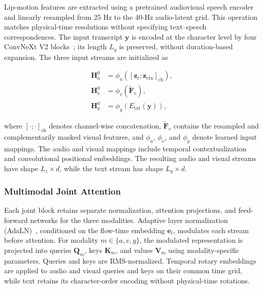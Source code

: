 Lip-motion features are extracted using a pretrained audiovisual speech encoder~\cite{shi2022avhubert} and linearly resampled from 25 Hz to the 40-Hz audio-latent grid. This operation matches physical-time resolutions without specifying text–speech correspondences. The input transcript \(\mathbf{y}\) is encoded at the character level by four ConvNeXt V2 blocks~\cite{woo2023convnext,chen2025f5tts}; its length \(L_y\) is preserved, without duration-based expansion. The three input streams are initialized as

\begin{equation}
\begin{aligned}
\mathbf{H}_a^0
&=
\phi_a\!\left(
[\mathbf{z}_t;\mathbf{z}_{\mathrm{ctx}}]_{\mathrm{ch}}
\right),\\
\mathbf{H}_v^0
&=
\phi_v(\widetilde{\mathbf{F}}_v),\\
\mathbf{H}_y^0
&=
\phi_y(E_{\mathrm{txt}}(\mathbf{y})),
\end{aligned}
\label{eq:audio_input}
\end{equation}

where \([\cdot;\cdot]_{\mathrm{ch}}\) denotes channel-wise concatenation, \(\widetilde{\mathbf{F}}_v\) contains the resampled and complementarily masked visual features, and \(\phi_a\), \(\phi_v\), and \(\phi_y\) denote learned input mappings. The audio and visual mappings include temporal contextualization and convolutional positional embeddings. The resulting audio and visual streams have shape \(L_z\times d\), while the text stream has shape \(L_y\times d\).

\subsubsection{Multimodal Joint Attention}

Each joint block retains separate normalization, attention projections, and feed-forward networks for the three modalities. Adaptive layer normalization (AdaLN)~\cite{peebles2023dit}, conditioned on the flow-time embedding \(\mathbf{e}_t\), modulates each stream before attention. For modality \(m\in\{a,v,y\}\), the modulated representation is projected into queries \(\mathbf{Q}_m\), keys \(\mathbf{K}_m\), and values \(\mathbf{V}_m\) using modality-specific parameters. Queries and keys are RMS-normalized. Temporal rotary embeddings~\cite{su2024roformer} are applied to audio and visual queries and keys on their common time grid, while text retains its character-order encoding without physical-time rotations.

